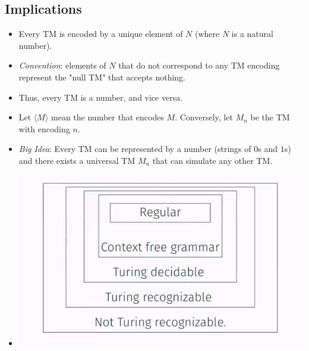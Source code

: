 \subsection{Implications}
\begin{itemize}
    \item Every TM is encoded by a unique element of $N$ (where $N$ is a natural number).
    \item \textit{Convention}: elements of $N$ that do not correspond to any TM encoding represent the "null TM" that accepts nothing.
    \item Thus, every TM is a number, and vice versa.
    \item Let $\langle M \rangle$ mean the number that encodes $M$. Conversely, let $M_n$ be the TM with encoding $n$.
    \item \textit{Big Idea}: Every TM can be represented by a number (strings of $0$s and $1$s) and there exists a universal TM $M_u$ that can simulate any other TM.
    \item[] \includegraphics[width=\textwidth]{lecture9/images/turing-recognizable.png}
\end{itemize}
